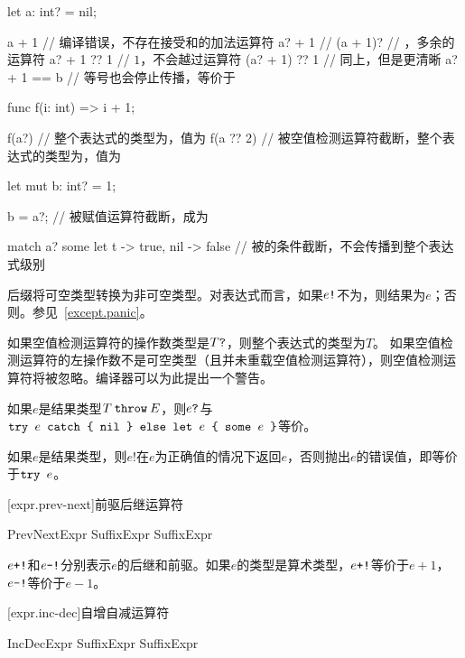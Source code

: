 \enterexample
\begin{codeblock}
let a: int? = nil;

a + 1 // 编译错误，不存在接受和的加法运算符
a? + 1 // 
(a + 1)? // ，多余的运算符
a? + 1 ?? 1 // $1$，不会越过运算符
(a? + 1) ?? 1 // 同上，但是更清晰
a? + 1 == b // 等号也会停止传播，等价于

func f(i: int) => i + 1;

f(a?) // 整个表达式的类型为，值为
f(a ?? 2) // 被空值检测运算符截断，整个表达式的类型为，值为

let mut b: int? = 1;

b = a?; // 被赋值运算符截断，成为

match a? { some let t -> true, nil -> false } // 被的条件截断，不会传播到整个表达式级别
\end{codeblock}
\exitexample

\pnum
后缀\tcode{!}将可空类型转换为非可空类型。对表达式而言，如果$e\texttt{!}$不为，则结果为$e$；否则。参见~\ref{except.panic}。

\pnum
如果空值检测运算符的操作数类型是$T\texttt{?}$，则整个表达式的类型为$T$。
如果空值检测运算符的左操作数不是可空类型（且并未重载空值检测运算符），则空值检测运算符将被忽略。编译器可以为此提出一个警告。

\pnum
如果$e$是结果类型$T\mathbin{\texttt{throw}}E$，则$e\texttt{?}$与$\texttt{try }e\texttt{ catch \{ nil \} else let }e\texttt{ \{ some }e\texttt{ \}}$等价。

\pnum
如果$e$是结果类型，则$e!$在$e$为正确值的情况下返回$e$，否则抛出$e$的错误值，即等价于$\texttt{try }e$。

[expr.prev-next]{前驱后继运算符}

\begin{bnf}{PrevNextExpr}
    SuffixExpr \terminal{+!} \br
    SuffixExpr \terminal{-!}
\end{bnf}

\pnum
$e\texttt{+!}$和$e\texttt{-!}$分别表示$e$的后继和前驱。如果$e$的类型是算术类型，$e\texttt{+!}$等价于$e+1$，$e\texttt{-!}$等价于$e-1$。

[expr.inc-dec]{自增自减运算符}

\begin{bnf}{IncDecExpr}
    SuffixExpr \terminal{++} \br
    SuffixExpr \terminal{--}
\end{bnf}

